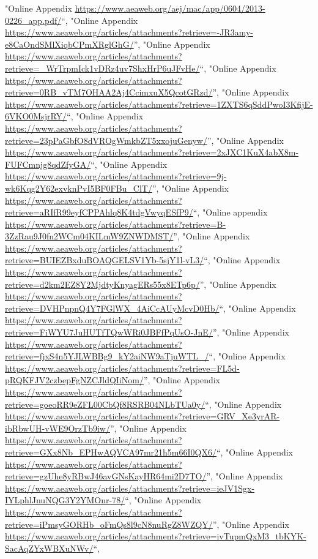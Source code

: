 \documentclass[]{article}
\begin{document}
\begin{itemize}
  "Online Appendix
  \url{https://www.aeaweb.org/aej/mac/app/0604/2013-0226_app.pdf/}``,
  "Online Appendix
  \url{https://www.aeaweb.org/articles/attachments?retrieve=-JR3amy-e8CaOndSMlXiqbCPmXRglGhG/}'',
  "Online Appendix
  \url{https://www.aeaweb.org/articles/attachments?retrieve=_WrTrpmIck1vDRz4uv7ShxHrP6uJFvHe/}``,
  "Online Appendix
  \url{https://www.aeaweb.org/articles/attachments?retrieve=0RB_vTM7OHAA2Aj4CcimxuX5QcotGRzd/}'',
  "Online Appendix
  \url{https://www.aeaweb.org/articles/attachments?retrieve=1ZXTS6qSddPwoI3KfijE-6VKO0MsjrRY/}``,
  "Online Appendix
  \url{https://www.aeaweb.org/articles/attachments?retrieve=23pPaGbfO8dVROgWmkbZT5xxojuGenyw/}'',
  "Online Appendix
  \url{https://www.aeaweb.org/articles/attachments?retrieve=2xJXC1KuX4abX8m-FUFCmnjg8qdZfyGA/}``,
  "Online Appendix
  \url{https://www.aeaweb.org/articles/attachments?retrieve=9j-wk6Kqg2Y62exvknPvI5BF0FBu_ClT/}'',
  "Online Appendix
  \url{https://www.aeaweb.org/articles/attachments?retrieve=aRIfR99eyfCPPAhlq8K4tdgVwyqESfP9/}``,
  "Online appendix
  \url{https://www.aeaweb.org/articles/attachments?retrieve=B-3ZzRau9J0fn2WCm04KILmW9ZNWDMST/}'',
  "Online Appendix
  \url{https://www.aeaweb.org/articles/attachments?retrieve=BUIEZBxduBOAQGELSV1Yb-5sjY1l-vL3/}``,
  "Online Appendix
  \url{https://www.aeaweb.org/articles/attachments?retrieve=d2km2EZ8Y2MjdtyKnyagERs55x8ETp6p/}'',
  "Online Appendix
  \url{https://www.aeaweb.org/articles/attachments?retrieve=DVHPnpnQ4Y7FGlWX_4AiCcAUyMcvD0Hb/}``,
  "Online Appendix
  \url{https://www.aeaweb.org/articles/attachments?retrieve=FiWYU7JuHUTfTQwWRi0JBFfPqUsO-JnE/}'',
  "Online Appendix
  \url{https://www.aeaweb.org/articles/attachments?retrieve=fjxS4n5YJLWBBg9_kY2aiNW9aTjuWTL_/}``,
  "Online Appendix
  \url{https://www.aeaweb.org/articles/attachments?retrieve=FL5d-pRQKFJV2czbepFgNZCJldQIiNom/}'',
  "Online Appendix
  \url{https://www.aeaweb.org/articles/attachments?retrieve=goeoRR9eZFL00CbQf8RSRB04NLbTUa0y/}``,
  "Online Appendix
  \url{https://www.aeaweb.org/articles/attachments?retrieve=GRV_Xe3yrAR-ibRbwUH-vWE9OrzTb9iw/}'',
  "Online Appendix
  \url{https://www.aeaweb.org/articles/attachments?retrieve=GXx8Nb_EPHwAQVCA97mr21h5m66I0QX6/}``,
  "Online Appendix
  \url{https://www.aeaweb.org/articles/attachments?retrieve=gzUhe8yRBwJ46avGNsKayHR64mi2D7TO/}'',
  "Online Appendix
  \url{https://www.aeaweb.org/articles/attachments?retrieve=ieJV1Sgx-IYLphlJnuNQG3Y2YMOnr-78/}``,
  "Online Appendix
  \url{https://www.aeaweb.org/articles/attachments?retrieve=iPmsyGORHb_oFmQs8l9cN8nuRgZ8WZQY/}'',
  "Online Appendix
  \url{https://www.aeaweb.org/articles/attachments?retrieve=ivTupmQxM3_tbKYK-SacAqZYxWBXuNWv/}``,

\end{itemize}
\end{document}
